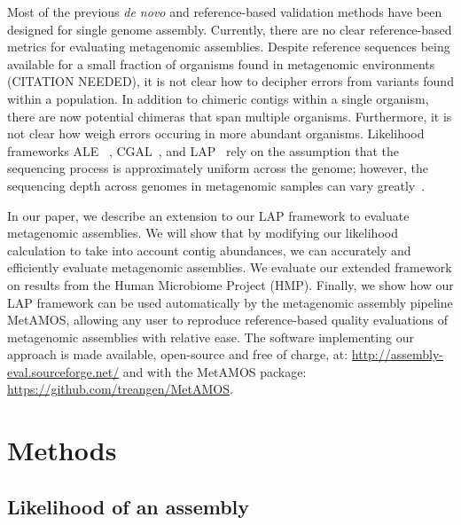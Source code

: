 \documentclass[conference]{IEEEtran}
\begin{document}
Most of the previous \emph{de novo} and reference-based validation methods have been designed for single genome assembly.
Currently, there are no clear reference-based metrics for evaluating metagenomic assemblies.
Despite reference sequences being available for a small fraction of organisms found in metagenomic environments (CITATION NEEDED), it is not clear how to decipher errors from variants found within a population.
In addition to chimeric contigs within a single organism, there are now potential chimeras that span multiple organisms.
Furthermore, it is not clear how weigh errors occuring in more abundant organisms.
Likelihood frameworks ALE ~\cite{clark2013ale}, CGAL~\cite{rahman2013cgal}, and LAP~\cite{LAP} rely on the assumption that the sequencing process is approximately uniform across the genome; however, the sequencing depth across genomes in metagenomic samples can vary greatly~\cite{carrigg2007dna,krsek1999comparison,morgan2010metagenomic,temperton2009bias,darling2004mauve}.


In our paper, we describe an extension to our LAP framework to evaluate metagenomic assemblies.
We will show that by modifying our likelihood calculation to take into account contig abundances, we can accurately and efficiently evaluate metagenomic assemblies.
We evaluate our extended framework on results from the Human Microbiome Project (HMP).
Finally, we show how our LAP framework can be used automatically by the metagenomic assembly pipeline MetAMOS, allowing any user to reproduce reference-based quality evaluations of metagenomic assemblies with relative ease.
The software implementing our approach is made available, open-source and free of charge, at: \url{http://assembly-eval.sourceforge.net/} and with the MetAMOS package: \url{https://github.com/treangen/MetAMOS}.

 

\section{Methods}
\subsection{Likelihood of an assembly}
\end{document}
